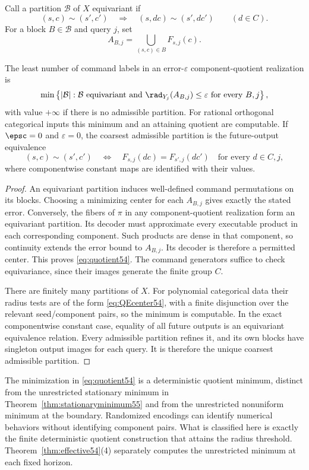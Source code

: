 Call a partition $\mathcal B$ of $X$ equivariant if
\[
 (s,c)\sim(s',c')\quad\Longrightarrow\quad
 (s,dc)\sim(s',dc')\qquad(d\in C).
\]
For a block $B\in\mathcal B$ and query $j$, set
\[
 A_{B,j}=\bigcup_{(s,c)\in B}F_{s,j}(c).
\]
\begin{theorem}\label{thm:quotient54}
The least number of command labels in an error-$\varepsilon$ component-quotient realization is
\begin{equation}\label{eq:quotient54}
 \min\left\{|\mathcal B|:\mathcal B\text{ equivariant and }
         \rad_{Y_j}(A_{B,j})\le\varepsilon\text{ for every }B,j\right\},
\end{equation}
with value $+\infty$ if there is no admissible partition. For rational orthogonal categorical inputs this minimum and an attaining quotient are computable. If $\epsc=0$ and $\varepsilon=0$, the coarsest admissible partition is the future-output equivalence
\[
 (s,c)\sim(s',c')\quad\Longleftrightarrow\quad
 F_{s,j}(dc)=F_{s',j}(dc')\quad\text{for every }d\in C,j,
\]
where componentwise constant maps are identified with their values.
\end{theorem}
\begin{proof}
An equivariant partition induces well-defined command permutations on its blocks. Choosing a minimizing center for each $A_{B,j}$ gives exactly the stated error. Conversely, the fibers of $\pi$ in any component-quotient realization form an equivariant partition. Its decoder must approximate every executable product in each corresponding component. Such products are dense in that component, so continuity extends the error bound to $A_{B,j}$. Its decoder is therefore a permitted center. This proves \eqref{eq:quotient54}. The command generators suffice to check equivariance, since their images generate the finite group $C$.

There are finitely many partitions of $X$. For polynomial categorical data their radius tests are of the form \eqref{eq:QEcenter54}, with a finite disjunction over the relevant seed/component pairs, so the minimum is computable. In the exact componentwise constant case, equality of all future outputs is an equivariant equivalence relation. Every admissible partition refines it, and its own blocks have singleton output images for each query. It is therefore the unique coarsest admissible partition.
\end{proof}
The minimization in \eqref{eq:quotient54} is a deterministic quotient minimum, distinct from the unrestricted stationary minimum in Theorem~\ref{thm:stationaryminimum55} and from the unrestricted nonuniform minimum at the boundary. Randomized encodings can identify numerical behaviors without identifying component pairs. What is classified here is exactly the finite deterministic quotient construction that attains the radius threshold. Theorem~\ref{thm:effective54}(4) separately computes the unrestricted minimum at each fixed horizon.

